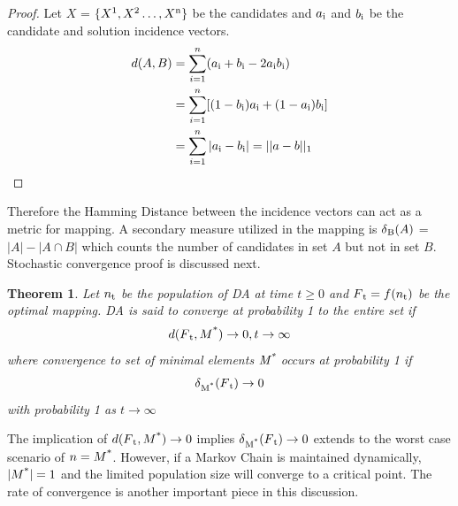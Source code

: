 \documentclass[conference]{IEEEtran}
\newtheorem{theorem}{Theorem}
\begin{document}
\begin{proof}\renewcommand{\qedsymbol}{}
Let $X$ = $\{X\textsuperscript{1}, X\textsuperscript{2} \dots, X\textsuperscript{n} \}$ be the candidates and $a\textsubscript{i}$ and $b\textsubscript{i}$ be the candidate and solution incidence vectors. \\
{\scriptsize
\begin{align*}
d(A,B) &= \sum_{i=1}^{n}(a\textsubscript{i} + b\textsubscript{i} - 2a\textsubscript{i}b\textsubscript{i})\\
 &= \sum_{i=1}^{n}[(1-b\textsubscript{i})a\textsubscript{i} + (1-a\textsubscript{i})b\textsubscript{i}]\\
 &= \sum_{i=1}^{n}|a\textsubscript{i} - b\textsubscript{i}| = ||a - b||\textsubscript{1}
\end{align*}
}
\end{proof}
Therefore the Hamming Distance between the incidence vectors can act as a metric for mapping. A secondary measure utilized in the mapping is $\delta\textsubscript{B}(A)$ = $|A| - |A \cap B|$ which counts the number of candidates in set $A$ but not in set $B$. Stochastic convergence proof is discussed next. 

\begin{theorem}
Let $n\textsubscript{t}$ be the population of DA at time $t \geq 0$ and $F\textsubscript{t} = f(n\textsubscript{t})$ be the optimal mapping. DA is said to converge at probability 1 to the entire set if
{\scriptsize
\begin{equation*}
d(F\textsubscript{t}, M\textsuperscript{*}) \rightarrow 0,  t \rightarrow \infty
\end{equation*}
}
where convergence to set of minimal elements $\textit{M\textsuperscript{*}}$ occurs at probability 1 if 
{\scriptsize
\begin{equation*}
\delta\textsubscript{M\textsuperscript{*}}(F\textsubscript{t}) \rightarrow 0\\
\end{equation*}
}
with probability 1 as $\textit{t} \rightarrow \infty$
\end{theorem}

The implication of $d(F\textsubscript{t}, M\textsuperscript{*}) \rightarrow 0$ implies $\delta\textsubscript{M\textsuperscript{*}}(F\textsubscript{t}) \rightarrow 0$ extends to the worst case scenario of $n = M\textsuperscript{*}$. However, if a Markov Chain is maintained dynamically, $|M\textsuperscript{*}|=1$ and the limited population size will converge to a critical point. The rate of convergence is another important piece in this discussion. 
\end{document}
